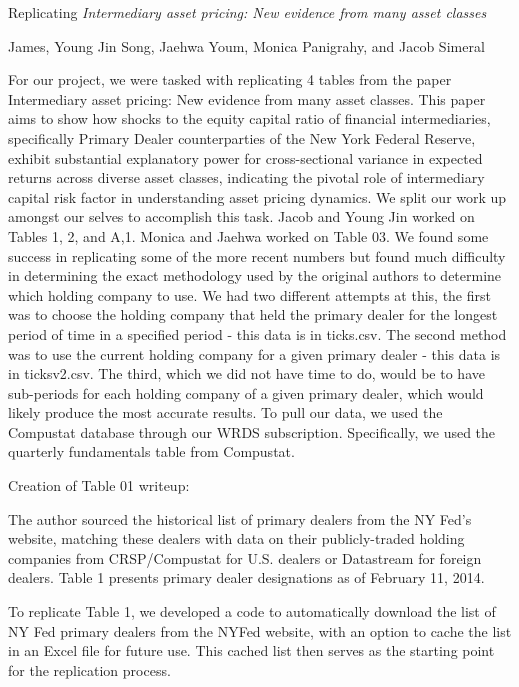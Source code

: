 \documentclass{article}
\begin{document}
\usepackage{color}
{
\fontsize{12}{14}\selectfont
\textnormal{Replicating} \textit{Intermediary asset pricing: New evidence from many asset classes}
}

\bigskip

{
\fontsize{10}{12}\selectfont
James, Young Jin Song, Jaehwa Youm, Monica Panigrahy, and Jacob Simeral
}
\clearpage

For our project, we were tasked with replicating 4 tables from the paper Intermediary asset pricing: New evidence from many asset classes. This paper aims to show how shocks to the equity capital ratio of financial intermediaries, specifically Primary Dealer counterparties of the New York Federal Reserve, exhibit substantial explanatory power for cross-sectional variance in expected returns across diverse asset classes, indicating the pivotal role of intermediary capital risk factor in understanding asset pricing dynamics. We split our work up amongst our selves to accomplish this task. Jacob and Young Jin worked on Tables 1, 2, and A,1. Monica and Jaehwa worked on Table 03.
We found some success in replicating some of the more recent numbers but found much difficulty in determining the exact methodology used by the original authors to determine which holding company to use. We had two different attempts at this, the first was to choose the holding company that held the primary dealer for the longest period of time in a specified period - this data is in ticks.csv. The second method was to use the current holding company for a given primary dealer - this data is in ticksv2.csv. The third, which we did not have time to do, would be to have sub-periods for each holding company of a given primary dealer, which would likely produce the most accurate results.
To pull our data, we used the Compustat database through our WRDS subscription. Specifically, we used the quarterly fundamentals table from Compustat.
\clearpage

\clearpage
Creation of Table 01 writeup:

The author sourced the historical list of primary dealers from the NY Fed's website, matching these dealers with data on their publicly-traded holding companies from CRSP/Compustat for U.S. dealers or Datastream for foreign dealers. Table 1 presents primary dealer designations as of February 11, 2014.

To replicate Table 1, we developed a code to automatically download the list of NY Fed primary dealers from the NYFed website, with an option to cache the list in an Excel file for future use. This cached list then serves as the starting point for the replication process.
\end{document}
